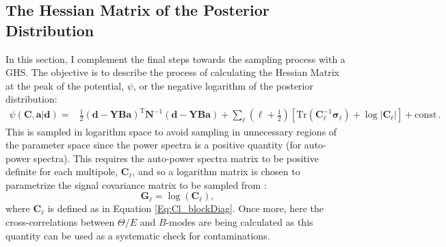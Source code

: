 \subsection{The Hessian Matrix of the Posterior Distribution}\label{Sec:BPL:Hessian}
In this section, I complement the final steps towards the sampling process with a GHS. The objective is to describe the process of calculating the Hessian Matrix at the peak of the potential, $\psi$, or the negative logarithm of the posterior distribution: 
\begin{align}
\psi(\mathbf{C},\mathbf{a}|\mathbf{d}) = & \frac{1}{2}(\mathbf{d}-\mathbf{YBa})^{\mathrm{T}}\mathbf{N}^{-1}(\mathbf{d}-\mathbf{YBa})+\sum_{\ell}\left( {\ell}+\frac{1}{2}\right)\left[ \mathrm{Tr}(\mathbf{C}_{\ell}^{-1}\boldsymbol{\sigma}_{\ell}) + \log\left|\mathbf{C}_{\ell} \right|\right] + \mathrm{const}\, .
\end{align}
This is sampled in logarithm space to avoid sampling in unnecessary regions of the parameter space since the power spectra is a positive quantity (for auto-power spectra). This requires the auto-power spectra matrix to be positive definite for each multipole, $\mathbf{C}_{\ell}$, and so a logarithm matrix is chosen to parametrize the signal covariance matrix to be sampled from \citep{Taylor2008}:
\begin{equation}
\mathbf{G}_{\ell}=\log(\mathbf{C}_{\ell}),
\end{equation}
where $\mathbf{C}_{\ell}$ is defined as in Equation \eqref{Eq:Cl_blockDiag}. Once more, here the cross-correlations between $\Theta/E$ and $B$-modes are being calculated as this quantity can be used as a systematic check for contaminations.

